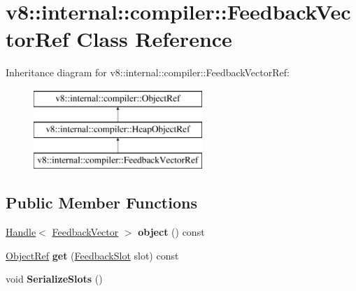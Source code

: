 \hypertarget{classv8_1_1internal_1_1compiler_1_1FeedbackVectorRef}{}\section{v8\+:\+:internal\+:\+:compiler\+:\+:Feedback\+Vector\+Ref Class Reference}
\label{classv8_1_1internal_1_1compiler_1_1FeedbackVectorRef}
Inheritance diagram for v8\+:\+:internal\+:\+:compiler\+:\+:Feedback\+Vector\+Ref\+:\begin{figure}[H]
\begin{center}
\leavevmode
\includegraphics[height=3.000000cm]{classv8_1_1internal_1_1compiler_1_1FeedbackVectorRef}
\end{center}
\end{figure}
\subsection*{Public Member Functions}
\begin{DoxyCompactItemize}
\item 
\mbox{\label{classv8_1_1internal_1_1compiler_1_1FeedbackVectorRef_a38fa11e564663520dbadd363d3fc6520}} 
\mbox{\hyperlink{classv8_1_1internal_1_1Handle}{Handle}}$<$ \mbox{\hyperlink{classv8_1_1internal_1_1FeedbackVector}{Feedback\+Vector}} $>$ {\bfseries object} () const
\item 
\mbox{\label{classv8_1_1internal_1_1compiler_1_1FeedbackVectorRef_afb5d5d97513ff499b84e7a455ce8bbb5}} 
\mbox{\hyperlink{classv8_1_1internal_1_1compiler_1_1ObjectRef}{Object\+Ref}} {\bfseries get} (\mbox{\hyperlink{classv8_1_1internal_1_1FeedbackSlot}{Feedback\+Slot}} slot) const
\item 
\mbox{\label{classv8_1_1internal_1_1compiler_1_1FeedbackVectorRef_aa0f395e4b7938128687c159526ce1e41}} 
void {\bfseries Serialize\+Slots} ()
\end{DoxyCompactItemize}
